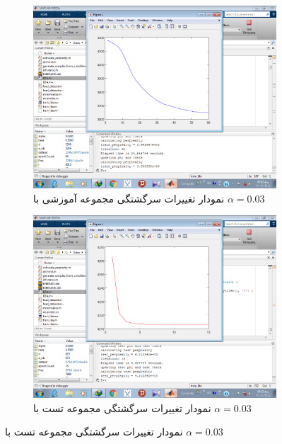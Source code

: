 \documentclass[11.5pt,a4paper]{article}
\begin{document}
\begin{figure}[h]
	\begin{subfigure}{.45\textwidth}
		\includegraphics[scale=0.25]{Imgs/k3_b05_a003_25s_ptr3648938.png}
		\caption{نمودار تغییرات سرگشتگی مجموعه‌ آموزشی با $\alpha = 0.03$}
	\end{subfigure}
	\begin{subfigure}{.45\textwidth}
		\includegraphics[scale=0.25]{Imgs/k3_b05_a003_8s_pts4212840.png}
		\caption{نمودار تغییرات سرگشتگی مجموعه‌ تست با $\alpha = 0.03$}
	\end{subfigure}


\end{figure}
\end{document}
